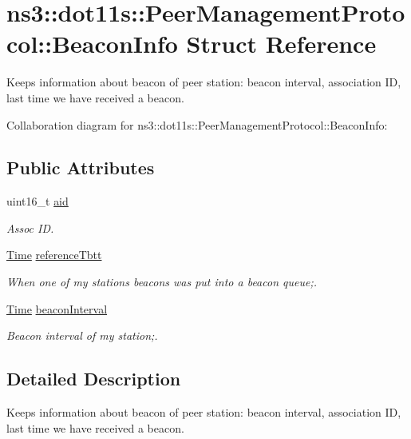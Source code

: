 \hypertarget{structns3_1_1dot11s_1_1PeerManagementProtocol_1_1BeaconInfo}{}\section{ns3\+:\+:dot11s\+:\+:Peer\+Management\+Protocol\+:\+:Beacon\+Info Struct Reference}
\label{structns3_1_1dot11s_1_1PeerManagementProtocol_1_1BeaconInfo}


Keeps information about beacon of peer station\+: beacon interval, association ID, last time we have received a beacon.  




Collaboration diagram for ns3\+:\+:dot11s\+:\+:Peer\+Management\+Protocol\+:\+:Beacon\+Info\+:
\subsection*{Public Attributes}
\begin{DoxyCompactItemize}
\item 
uint16\+\_\+t \hyperlink{structns3_1_1dot11s_1_1PeerManagementProtocol_1_1BeaconInfo_ab541c165dfa81e8a18257808c3e443d4}{aid}
\begin{DoxyCompactList}\small\item\em Assoc ID. \end{DoxyCompactList}\item 
\hyperlink{classns3_1_1Time}{Time} \hyperlink{structns3_1_1dot11s_1_1PeerManagementProtocol_1_1BeaconInfo_a687518e3c9efcd205cb3324d4f1e4b62}{reference\+Tbtt}
\begin{DoxyCompactList}\small\item\em When one of my station\textquotesingle{}s beacons was put into a beacon queue;. \end{DoxyCompactList}\item 
\hyperlink{classns3_1_1Time}{Time} \hyperlink{structns3_1_1dot11s_1_1PeerManagementProtocol_1_1BeaconInfo_aa2eae280e18efb4d5eba32eacd685732}{beacon\+Interval}
\begin{DoxyCompactList}\small\item\em Beacon interval of my station;. \end{DoxyCompactList}\end{DoxyCompactItemize}


\subsection{Detailed Description}
Keeps information about beacon of peer station\+: beacon interval, association ID, last time we have received a beacon. 

